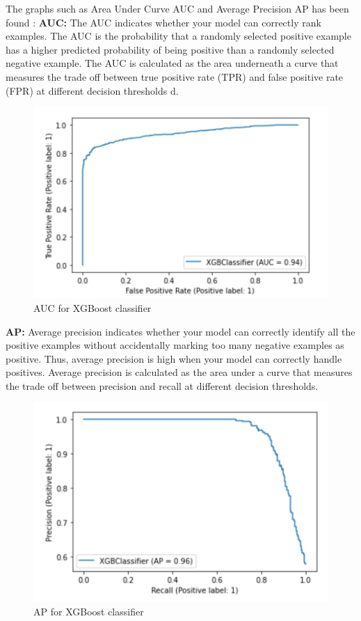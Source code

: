 \documentclass[12pt]{article}
\begin{document}
The graphs such as Area Under Curve AUC and Average Precision AP has been found :
\textbf{AUC:}
The AUC indicates whether your model can correctly rank examples. The AUC is the probability that a randomly selected positive example has a higher predicted probability of being positive than a randomly selected negative example. The AUC is calculated as the area underneath a curve that measures the trade off between true positive rate (TPR) and false positive rate (FPR) at different decision thresholds d.
\begin{figure}[H]
\begin{center}
\includegraphics[scale=.4]{ResultP2}
\caption{AUC for XGBoost classifier}
\end{center}
\end{figure}
\textbf{AP:}
Average precision indicates whether your model can correctly identify all the positive examples without accidentally marking too many negative examples as positive. Thus, average precision is high when your model can correctly handle positives. Average precision is calculated as the area under a curve that measures the trade off between precision and recall at different decision thresholds.
\begin{figure}[H]
\begin{center}
\includegraphics[scale=.4]{ResultP3}
\caption{AP for XGBoost classifier}
\end{center}
\end{figure}
\end{document}
